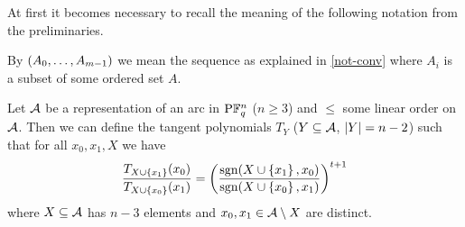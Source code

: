At first it becomes necessary to recall the meaning of the following notation from the preliminaries.

\begin{convention}
    By $\seq{\range{A_0}{A_{m-1}}}$ we mean the sequence as explained in \autoref{not-conv} where $A_i$ is a subset of some ordered set $A$.%
\end{convention}


\begin{corollary}\label{mds-segre-simplified}
    Let $\mathcal{A}$ be a representation of an arc in $\P \field{q}^n$ ($n\geq 3$) and $\leq$ some linear
    order on $\mathcal{A}$. Then we can define the tangent polynomials $T_Y$
    ($Y\subseteq \mathcal{A}$, $\left\vert{Y}\right\vert=n-2$) such that for all $x_0,x_1,X$ we have
    $$    \frac{T_{X\setjoin\set{x_1}}(x_0)}{T_{X\setjoin\set{x_0}}(x_1)}={\left(\frac{\sgn(X\setjoin\set{x_1},x_0)}{\sgn(X\setjoin\set{x_0},x_1)}\right)}^{t+1}
    $$
    where $X\subseteq \mathcal{A}$ has $n-3$ elements and $x_0,x_1\in \mathcal{A}\setminus X$ are distinct.
\end{corollary}

